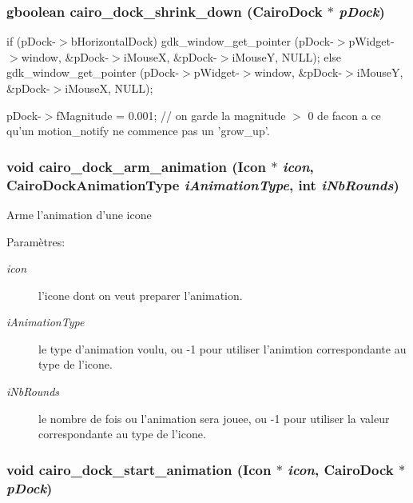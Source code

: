 \subsubsection{\setlength{\rightskip}{0pt plus 5cm}gboolean cairo\_\-dock\_\-shrink\_\-down ({\bf Cairo\-Dock} $\ast$ {\em p\-Dock})}\label{cairo-dock-animations_8c_9c19b3db8ce61a2e377cbd66aff22ee3}


if (p\-Dock-$>$b\-Horizontal\-Dock) gdk\_\-window\_\-get\_\-pointer (p\-Dock-$>$p\-Widget-$>$window, \&p\-Dock-$>$i\-Mouse\-X, \&p\-Dock-$>$i\-Mouse\-Y, NULL); else gdk\_\-window\_\-get\_\-pointer (p\-Dock-$>$p\-Widget-$>$window, \&p\-Dock-$>$i\-Mouse\-Y, \&p\-Dock-$>$i\-Mouse\-X, NULL);

p\-Dock-$>$f\-Magnitude = 0.001; // on garde la magnitude $>$ 0 de facon a ce qu'un motion\_\-notify ne commence pas un 'grow\_\-up'. 
\subsubsection{\setlength{\rightskip}{0pt plus 5cm}void cairo\_\-dock\_\-arm\_\-animation ({\bf Icon} $\ast$ {\em icon}, {\bf Cairo\-Dock\-Animation\-Type} {\em i\-Animation\-Type}, int {\em i\-Nb\-Rounds})}\label{cairo-dock-animations_8c_2341802d978d04a570615adb01e1046f}


Arme l'animation d'une icone \begin{Desc}
\item[Param\`{e}tres:]
\begin{description}
\item[{\em icon}]l'icone dont on veut preparer l'animation. \item[{\em i\-Animation\-Type}]le type d'animation voulu, ou -1 pour utiliser l'animtion correspondante au type de l'icone. \item[{\em i\-Nb\-Rounds}]le nombre de fois ou l'animation sera jouee, ou -1 pour utiliser la valeur correspondante au type de l'icone. \end{description}
\end{Desc}
\subsubsection{\setlength{\rightskip}{0pt plus 5cm}void cairo\_\-dock\_\-start\_\-animation ({\bf Icon} $\ast$ {\em icon}, {\bf Cairo\-Dock} $\ast$ {\em p\-Dock})}\label{cairo-dock-animations_8c_551472639c25a63d7d996c7efea4960c}


